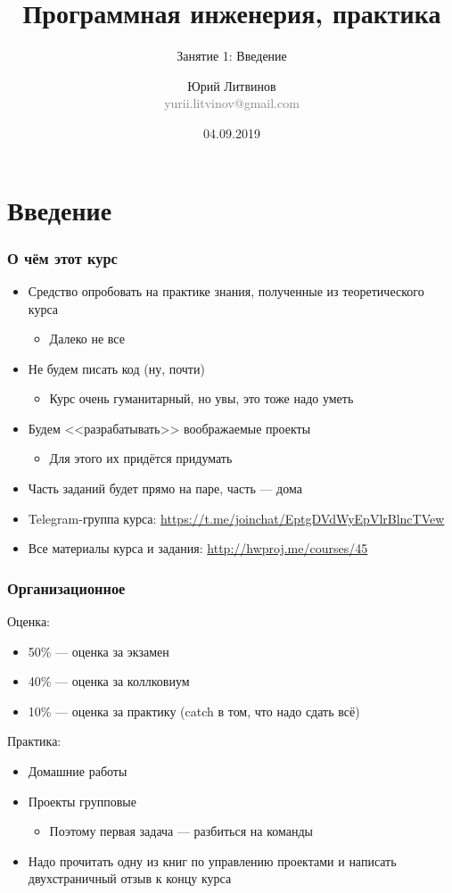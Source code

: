 \documentclass[xetex,mathserif,serif]{beamer}
\title{Программная инженерия, практика}
\subtitle{Занятие 1: Введение}
\author[Юрий Литвинов]{Юрий Литвинов\\\small{\textcolor{gray}{yurii.litvinov@gmail.com}}}
\date{04.09.2019}
\begin{document}
	\frame{\titlepage}

	\section{Введение}

	\begin{frame}
		\frametitle{О чём этот курс}
		\begin{itemize}
			\item Средство опробовать на практике знания, полученные из теоретического курса
			\begin{itemize}
				\item Далеко не все
			\end{itemize}
			\item Не будем писать код (ну, почти)
			\begin{itemize}
				\item Курс очень гуманитарный, но увы, это тоже надо уметь
			\end{itemize}
			\item Будем <<разрабатывать>> воображаемые проекты
			\begin{itemize}
				\item Для этого их придётся придумать
			\end{itemize}
			\item Часть заданий будет прямо на паре, часть --- дома
			\item Telegram-группа курса: \url{https://t.me/joinchat/EptgDVdWyEpVlrBlncTVew}
			\item Все материалы курса и задания: \url{http://hwproj.me/courses/45}
		\end{itemize}
	\end{frame}

	\begin{frame}
		\frametitle{Организационное}
		Оценка:
		\begin{itemize}
			\item 50\% --- оценка за экзамен
			\item 40\% --- оценка за коллковиум
			\item 10\% --- оценка за практику (catch в том, что надо сдать всё)
		\end{itemize}
		Практика:
		\begin{itemize}
			\item Домашние работы
			\item Проекты групповые
			\begin{itemize}
				\item Поэтому первая задача --- разбиться на команды
			\end{itemize}
			\item Надо прочитать одну из книг по управлению проектами и написать двухстраничный отзыв к концу курса
		\end{itemize}
	\end{frame}
\end{document}
